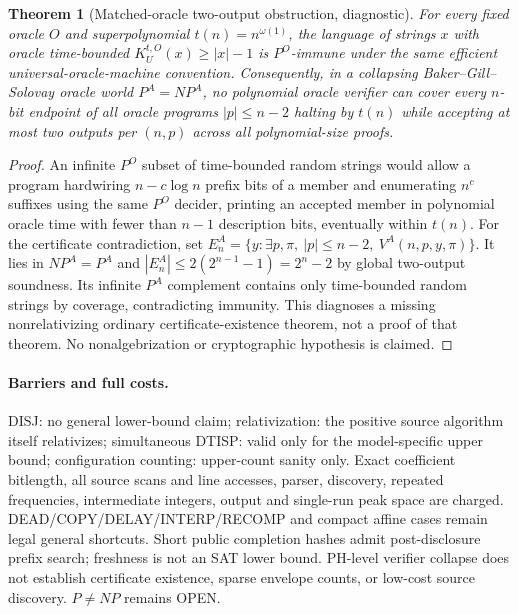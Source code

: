 \documentclass[11pt]{article}
\newtheorem{theorem}{Theorem}
\begin{document}
\begin{theorem}[Matched-oracle two-output obstruction, diagnostic]
For every fixed oracle $O$ and superpolynomial $t(n)=n^{\omega(1)}$, the language of strings $x$ with oracle time-bounded $K_U^{t,O}(x)\ge |x|-1$ is $P^O$-immune under the same efficient universal-oracle-machine convention. Consequently, in a collapsing Baker--Gill--Solovay oracle world $P^A=NP^A$, no polynomial oracle verifier can cover every $n$-bit endpoint of all oracle programs $|p|\le n-2$ halting by $t(n)$ while accepting at most two outputs per $(n,p)$ across all polynomial-size proofs.
\end{theorem}
\begin{proof}
An infinite $P^O$ subset of time-bounded random strings would allow a program hardwiring $n-c\log n$ prefix bits of a member and enumerating $n^c$ suffixes using the same $P^O$ decider, printing an accepted member in polynomial oracle time with fewer than $n-1$ description bits, eventually within $t(n)$. For the certificate contradiction, set $E_n^A=\{y:\exists p,\pi,\ |p|\le n-2,\ V^A(n,p,y,\pi)\}$. It lies in $NP^A=P^A$ and $|E_n^A|\le 2(2^{n-1}-1)=2^n-2$ by global two-output soundness. Its infinite $P^A$ complement contains only time-bounded random strings by coverage, contradicting immunity. This diagnoses a missing nonrelativizing ordinary certificate-existence theorem, not a proof of that theorem. No nonalgebrization or cryptographic hypothesis is claimed.
\end{proof}

\paragraph{Barriers and full costs.} DISJ: no general lower-bound claim; relativization: the positive source algorithm itself relativizes; simultaneous DTISP: valid only for the model-specific upper bound; configuration counting: upper-count sanity only. Exact coefficient bitlength, all source scans and line accesses, parser, discovery, repeated frequencies, intermediate integers, output and single-run peak space are charged. DEAD/COPY/DELAY/INTERP/RECOMP and compact affine cases remain legal general shortcuts. Short public completion hashes admit post-disclosure prefix search; freshness is not an SAT lower bound. PH-level verifier collapse does not establish certificate existence, sparse envelope counts, or low-cost source discovery. $P\ne NP$ remains OPEN.
\end{document}
